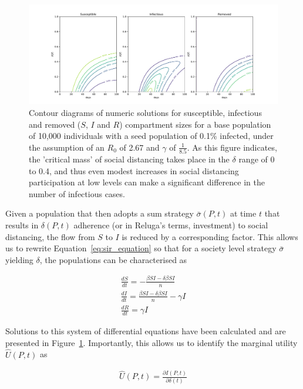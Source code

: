 \documentclass{article}
\begin{document}
\begin{figure}
	\includegraphics[width=\linewidth]{figures/fig3-SIR-by-delta}
	\caption{Contour diagrams of numeric solutions for susceptible, infectious and removed ($S$, $I$ and $R$) compartment sizes for a base population of 10,000 individuals with a seed population of 0.1\% infected, under the assumption of an $R_0$ of 2.67 and $\gamma$ of $\frac{1}{8.5}$. As this figure indicates, the 'critical mass' of social distancing takes place in the $\delta$ range of 0 to 0.4, and thus even modest increases in social distancing participation at low levels can make a significant difference in the number of infectious cases.}
	\label{fig:fig3-SIR-by-delta}
\end{figure}

Given a population that then adopts a sum strategy $\bar{\sigma}(P, t)$ at time $t$ that results in $\delta(P, t)$ adherence (or in Reluga's terms, investment) to social distancing, the flow from $S$ to $I$ is reduced by a corresponding factor. This allows us to rewrite Equation~\eqref{eq:sir_equation} so that for a society level strategy $\bar{\sigma}$ yielding $\delta$, the populations can be characterised as

\begin{equation}
	\begin{aligned}
		\frac{dS}{dt} = - \frac{\beta S I - \delta \beta S I}{n} 			\\
		\frac{dI}{dt} = \frac{\beta S I - \delta \beta S I}{n} - \gamma I	\\
		\frac{dR}{dt} = \gamma I
	\end{aligned}
	\label{eq:sir_with_social_distancing}
\end{equation}

Solutions to this system of differential equations have been calculated and are presented in Figure~\ref{fig:fig3-SIR-by-delta}. Importantly, this allows us to identify the marginal utility $\hat{U}(P, t)$ as

\begin{equation}
	\begin{aligned}
		\hat{U}(P, t) = \frac{\partial I(P, t)}{\partial \delta(t)}
	\end{aligned}
	\label{eq:marginal_utility}
\end{equation}
\end{document}
